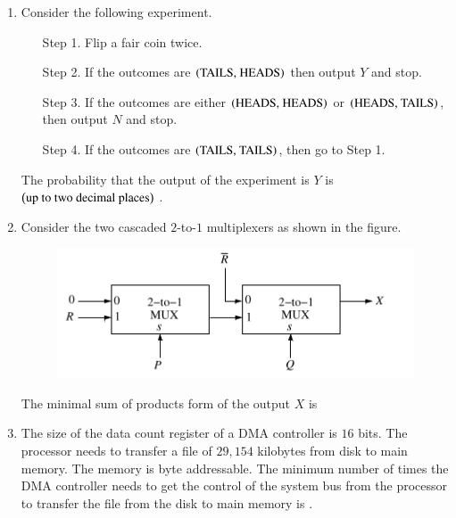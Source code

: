 \documentclass[journal,12pt,onecolumn]{IEEEtran}
\theoremstyle{remark}
\begin{document}
\begin{enumerate}
		\item Consider the following experiment.
		\begin{enumerate}
			\item[Step 1.] Flip a fair coin twice.
			\item[Step 2.] If the outcomes are $\left(\text{TAILS, HEADS}\right)$ then output $Y$ and stop.
			\item[Step 3.] If the outcomes are either $\left(\text{HEADS, HEADS}\right)$ or $\left(\text{HEADS, TAILS}\right)$, then output $N$ and stop.
			\item[Step 4.] If the outcomes are $\left(\text{TAILS, TAILS}\right)$, then go to Step 1.
		\end{enumerate}
		The probability that the output of the experiment is $Y$ is $\left(\text{up to two decimal places}\right)$ \underline{\hspace{2cm}}.
		
		\hfill{}
		
		\item Consider the two cascaded $2$-to-$1$ multiplexers as shown in the figure.
		
	\begin{figure}[H]
		\centering
		\includegraphics[width=0.5\linewidth]{figs/screenshot002}
		\caption{}
		\label{fig:screenshot002}
	\end{figure}
	
		
		The minimal sum of products form of the output $X$ is
		
		\hfill{}
		\begin{enumerate}
		\end{enumerate}
		
		\item The size of the data count register of a DMA controller is $16$ bits. The processor needs to transfer a file of $29,154$ kilobytes from disk to main memory. The memory is byte addressable. The minimum number of times the DMA controller needs to get the control of the system bus from the processor to transfer the file from the disk to main memory is \underline{\hspace{2cm}}.
		

\end{enumerate}
\end{document}
